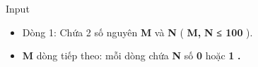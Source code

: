 Input
\begin{itemize}
	\item     Dòng 1: Chứa 2 số nguyên    \textbf{     M    }    và    \textbf{     N    }    (    \textbf{     M,    }\textbf{     N    }\textbf{     ≤ 100    }    ).   
	\item \textbf{     M    }    dòng tiếp theo: mỗi dòng chứa    \textbf{     N    }    số    \textbf{     0    }    hoặc    \textbf{     1    }\textbf{     .    }
\end{itemize}